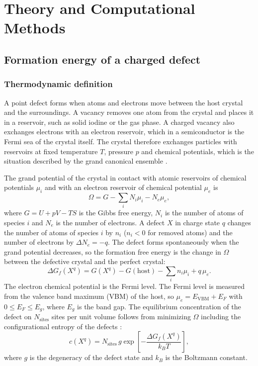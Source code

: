 
\chapter{Theory and Computational Methods}
\label{ch:methods}

\section{Formation energy of a charged defect}
\label{sec:formation-theory}

\subsection{Thermodynamic definition}

A point defect forms when atoms and electrons move between the host crystal and the surroundings. A vacancy removes one atom from the crystal and places it in a reservoir, such as solid iodine or the gas phase. A charged vacancy also exchanges electrons with an electron reservoir, which in a semiconductor is the Fermi sea of the crystal itself. The crystal therefore exchanges particles with reservoirs at fixed temperature $T$, pressure $p$ and chemical potentials, which is the situation described by the grand canonical ensemble \citep{VandeWalle2004,Freysoldt2014}.

The grand potential of the crystal in contact with atomic reservoirs of chemical potentials $\mu_i$ and with an electron reservoir of chemical potential $\mu_e$ is
\begin{equation*}
  \Omega = G - \sum_i N_i \mu_i - N_e \mu_e ,
\end{equation*}
where $G = U + pV - TS$ is the Gibbs free energy, $N_i$ is the number of atoms of species $i$ and $N_e$ is the number of electrons. A defect $X$ in charge state $q$ changes the number of atoms of species $i$ by $n_i$ ($n_i < 0$ for removed atoms) and the number of electrons by $\Delta N_e = -q$. The defect forms spontaneously when the grand potential decreases, so the formation free energy is the change in $\Omega$ between the defective crystal and the perfect crystal:
\begin{equation*}
  \Delta G_f(X^q) = G(X^q) - G(\mathrm{host}) - \sum_i n_i \mu_i + q\,\mu_e .
\end{equation*}
The electron chemical potential is the Fermi level. The Fermi level is measured from the valence band maximum (VBM) of the host, so $\mu_e = E_\mathrm{VBM} + E_F$ with $0 \le E_F \le E_g$, where $E_g$ is the band gap. The equilibrium concentration of the defect on $N_\mathrm{sites}$ sites per unit volume follows from minimizing $\Omega$ including the configurational entropy of the defects \citep{VandeWalle2004}:
\begin{equation*}
  c(X^q) = N_\mathrm{sites}\, g \exp\!\left[-\frac{\Delta G_f(X^q)}{k_B T}\right] ,
\end{equation*}
where $g$ is the degeneracy of the defect state and $k_B$ is the Boltzmann constant.

